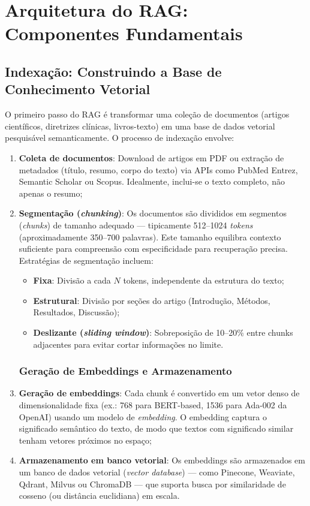\section{Arquitetura do RAG: Componentes Fundamentais}

\subsection{Indexação: Construindo a Base de Conhecimento Vetorial}

O primeiro passo do RAG é transformar uma coleção de documentos (artigos científicos, diretrizes clínicas, livros-texto) em uma base de dados vetorial pesquisável semanticamente. O processo de indexação envolve:

\begin{enumerate}
    \item \textbf{Coleta de documentos}: Download de artigos em PDF ou extração de metadados (título, resumo, corpo do texto) via APIs como PubMed Entrez, Semantic Scholar ou Scopus. Idealmente, inclui-se o texto completo, não apenas o resumo;

    \item \textbf{Segmentação (\textit{chunking})}: Os documentos são divididos em segmentos (\textit{chunks}) de tamanho adequado --- tipicamente 512--1024 \textit{tokens} (aproximadamente 350--700 palavras). Este tamanho equilibra contexto suficiente para compreensão com especificidade para recuperação precisa. Estratégias de segmentação incluem:
    \begin{itemize}
        \item \textbf{Fixa}: Divisão a cada $N$ tokens, independente da estrutura do texto;
        \item \textbf{Estrutural}: Divisão por seções do artigo (Introdução, Métodos, Resultados, Discussão);
    \item \textbf{Deslizante (\textit{sliding window})}: Sobreposição de 10--20\% entre chunks adjacentes para evitar cortar informações no limite.
\end{itemize}

\subsubsection{Geração de Embeddings e Armazenamento}

    \item \textbf{Geração de embeddings}: Cada chunk é convertido em um vetor denso de dimensionalidade fixa (ex.: 768 para BERT-based, 1536 para Ada-002 da OpenAI) usando um modelo de \textit{embedding}. O embedding captura o significado semântico do texto, de modo que textos com significado similar tenham vetores próximos no espaço;

    \item \textbf{Armazenamento em banco vetorial}: Os embeddings são armazenados em um banco de dados vetorial (\textit{vector database}) --- como Pinecone, Weaviate, Qdrant, Milvus ou ChromaDB --- que suporta busca por similaridade de cosseno (ou distância euclidiana) em escala.
\end{enumerate}

